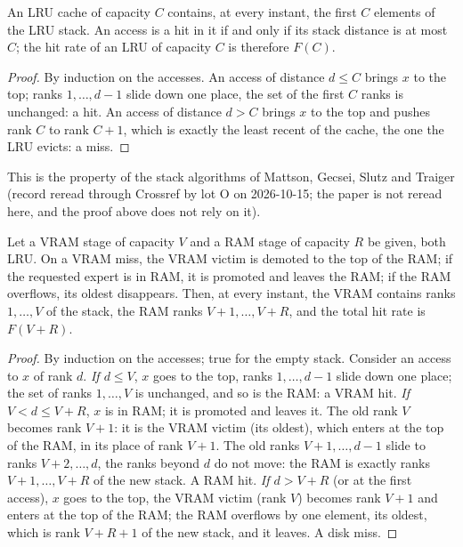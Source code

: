 \begin{lemme}\label{t3mim:lem:mattson}
An LRU cache of capacity $C$ contains, at every instant, the first $C$ elements of the LRU stack. An access is a hit in it if and only if its stack distance is at most $C$; the hit rate of an LRU of capacity $C$ is therefore $F(C)$.
\end{lemme}
\begin{proof}
By induction on the accesses. An access of distance $d \le C$ brings $x$ to the top; ranks $1, \dots, d-1$ slide down one place, the set of the first $C$ ranks is unchanged: a hit. An access of distance $d > C$ brings $x$ to the top and pushes rank $C$ to rank $C+1$, which is exactly the least recent of the cache, the one the LRU evicts: a miss.
\end{proof}
This is the property of the stack algorithms of Mattson, Gecsei, Slutz and Traiger \cite{mattson1970} (record reread through Crossref by lot O on 2026-10-15; the paper is not reread here, and the proof above does not rely on it).

\begin{theoreme}\label{t3mim:thm:exclusif}
Let a VRAM stage of capacity $V$ and a RAM stage of capacity $R$ be given, both LRU. On a VRAM miss, the VRAM victim is demoted to the top of the RAM; if the requested expert is in RAM, it is promoted and leaves the RAM; if the RAM overflows, its oldest disappears. Then, at every instant, the VRAM contains ranks $1, \dots, V$ of the stack, the RAM ranks $V+1, \dots, V+R$, and the total hit rate is $F(V+R)$.
\end{theoreme}
\begin{proof}
By induction on the accesses; true for the empty stack. Consider an access to $x$ of rank $d$.
\emph{If $d \le V$}, $x$ goes to the top, ranks $1, \dots, d-1$ slide down one place; the set of ranks $1, \dots, V$ is unchanged, and so is the RAM: a VRAM hit.
\emph{If $V < d \le V + R$}, $x$ is in RAM; it is promoted and leaves it. The old rank $V$ becomes rank $V+1$: it is the VRAM victim (its oldest), which enters at the top of the RAM, in its place of rank $V+1$. The old ranks $V+1, \dots, d-1$ slide to ranks $V+2, \dots, d$, the ranks beyond $d$ do not move: the RAM is exactly ranks $V+1, \dots, V+R$ of the new stack. A RAM hit.
\emph{If $d > V + R$} (or at the first access), $x$ goes to the top, the VRAM victim (rank $V$) becomes rank $V+1$ and enters at the top of the RAM; the RAM overflows by one element, its oldest, which is rank $V+R+1$ of the new stack, and it leaves. A disk miss.
\end{proof}

